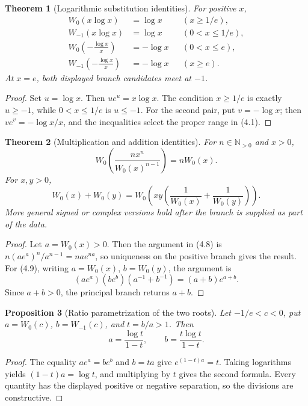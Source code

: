 \documentclass[11pt]{article}
\newtheorem{theorem}{Theorem}[section]
\newtheorem{proposition}[theorem]{Proposition}
\theoremstyle{definition}
\newcommand{\N}{\mathbb N}
\newcommand{\Wz}{W_0}
\newcommand{\Wm}{W_{-1}}
\begin{document}
\begin{theorem}[Logarithmic substitution identities]\label{thm:log-subst}
For positive \(x\),
\begin{align}
 \Wz(x\log x)&=\log x &&(x\ge1/e),\tag{4.4}\\
 \Wm(x\log x)&=\log x &&(0<x\le1/e),\tag{4.5}\\
 \Wz\!\left(-\frac{\log x}{x}\right)&=-\log x &&(0<x\le e),\tag{4.6}\\
 \Wm\!\left(-\frac{\log x}{x}\right)&=-\log x &&(x\ge e).\tag{4.7}
\end{align}
At \(x=e\), both displayed branch candidates meet at \(-1\).
\end{theorem}

\begin{proof}
Set \(u=\log x\).  Then \(ue^u=x\log x\).  The condition \(x\ge1/e\) is
exactly \(u\ge-1\), while \(0<x\le1/e\) is \(u\le-1\).  For the second pair,
put \(v=-\log x\); then \(ve^v=-\log x/x\), and the inequalities select the
proper range in (4.1).
\end{proof}

\begin{theorem}[Multiplication and addition identities]\label{thm:compound-identities}
For \(n\in\N_{>0}\) and \(x>0\),
\[
 \Wz\!\left(\frac{n x^n}{\Wz(x)^{n-1}}\right)=n\Wz(x).
 \tag{4.8}
\]
For \(x,y>0\),
\[
 \Wz(x)+\Wz(y)
 =\Wz\!\left(xy\left(\frac1{\Wz(x)}+\frac1{\Wz(y)}\right)\right).
 \tag{4.9}
\]
More general signed or complex versions hold after the branch is supplied as
part of the data.
\end{theorem}

\begin{proof}
Let \(a=\Wz(x)>0\).  Then the argument in (4.8) is
\(n(ae^a)^n/a^{n-1}=na e^{na}\), so uniqueness on the positive branch gives
the result.  For (4.9), writing \(a=\Wz(x)\), \(b=\Wz(y)\), the argument is
\[
 (ae^a)(be^b)(a^{-1}+b^{-1})=(a+b)e^{a+b}.
\]
Since \(a+b>0\), the principal branch returns \(a+b\).
\end{proof}

\begin{proposition}[Ratio parametrization of the two roots]\label{prop:ratio}
Let \(-1/e<c<0\), put \(a=\Wz(c)\), \(b=\Wm(c)\), and
\(t=b/a>1\).  Then
\[
 a=\frac{\log t}{1-t},\qquad
 b=\frac{t\log t}{1-t}.
 \tag{4.10}
\]
\end{proposition}

\begin{proof}
The equality \(ae^a=be^b\) and \(b=ta\) give
\(e^{(1-t)a}=t\).  Taking logarithms yields
\((1-t)a=\log t\), and multiplying by \(t\) gives the second formula.  Every
quantity has the displayed positive or negative separation, so the divisions
are constructive.
\end{proof}
\end{document}
